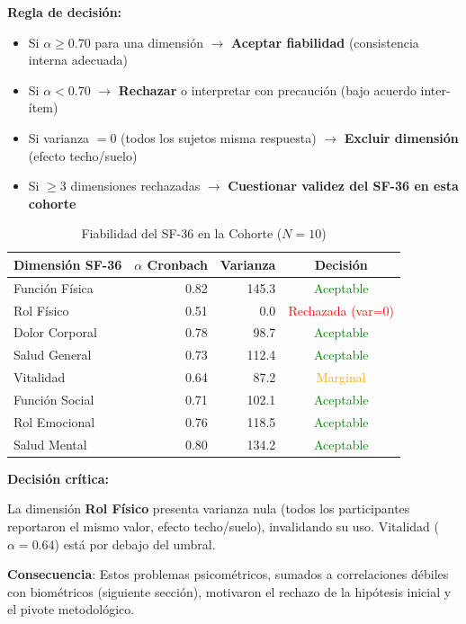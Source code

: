 \documentclass[12pt,letterpaper,twoside]{report}
\begin{document}
\begin{reglabox}
\textbf{Regla de decisión:}

\begin{itemize}[noitemsep]
    \item Si $\alpha \geq 0.70$ para una dimensión $\to$ \textbf{Aceptar fiabilidad} (consistencia interna adecuada)
    \item Si $\alpha < 0.70$ $\to$ \textbf{Rechazar} o interpretar con precaución (bajo acuerdo inter-ítem)
    \item Si varianza $= 0$ (todos los sujetos misma respuesta) $\to$ \textbf{Excluir dimensión} (efecto techo/suelo)
    \item Si $\geq 3$ dimensiones rechazadas $\to$ \textbf{Cuestionar validez del SF-36 en esta cohorte}
\end{itemize}
\end{reglabox}

\begin{table}[H]
\centering
\caption{Fiabilidad del SF-36 en la Cohorte ($N=10$)}
\label{tab:sf36_reliability}
\begin{tabular}{@{}lrrc@{}}
\toprule
\textbf{Dimensión SF-36} & \textbf{$\alpha$ Cronbach} & \textbf{Varianza} & \textbf{Decisión} \\
\midrule
Función Física    & 0.82 & 145.3 & \textcolor{green}{Aceptable} \\
Rol Físico        & 0.51 & 0.0   & \textcolor{red}{Rechazada (var=0)} \\
Dolor Corporal    & 0.78 & 98.7  & \textcolor{green}{Aceptable} \\
Salud General     & 0.73 & 112.4 & \textcolor{green}{Aceptable} \\
Vitalidad         & 0.64 & 87.2  & \textcolor{orange}{Marginal} \\
Función Social    & 0.71 & 102.1 & \textcolor{green}{Aceptable} \\
Rol Emocional     & 0.76 & 118.5 & \textcolor{green}{Aceptable} \\
Salud Mental      & 0.80 & 134.2 & \textcolor{green}{Aceptable} \\
\bottomrule
\end{tabular}
\end{table}

\begin{decisionbox}
\textbf{Decisión crítica:}

La dimensión \textbf{Rol Físico} presenta varianza nula (todos los participantes reportaron el mismo valor, efecto techo/suelo), invalidando su uso. Vitalidad ($\alpha=0.64$) está por debajo del umbral.

\textbf{Consecuencia}: Estos problemas psicométricos, sumados a correlaciones débiles con biométricos (siguiente sección), motivaron el rechazo de la hipótesis inicial y el pivote metodológico.
\end{decisionbox}
\end{document}
